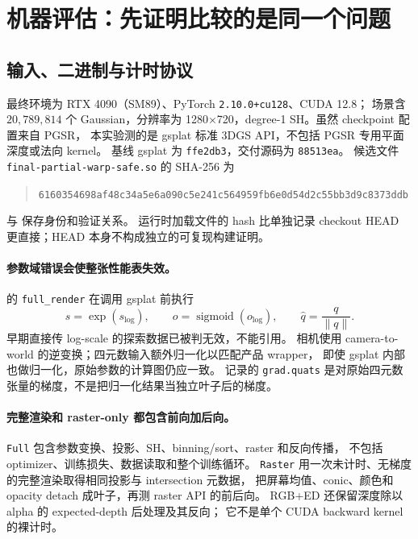 \section{机器评估：先证明比较的是同一个问题}

\subsection{输入、二进制与计时协议}

最终环境为 RTX 4090（SM89）、PyTorch \texttt{2.10.0+cu128}、CUDA 12.8；
场景含 \(20{,}789{,}814\) 个 Gaussian，分辨率为
1280\(\times\)720，degree-1 SH。虽然 checkpoint 配置来自 PGSR，
本实验测的是 gsplat 标准 3DGS API，不包括 PGSR 专用平面深度或法向 kernel。
基线 gsplat 为 \texttt{ffe2db3}，交付源码为 \texttt{88513ea}。
候选文件 \texttt{final-partial-warp-safe.so} 的 SHA-256 为
\begin{quote}\small\ttfamily
\nolinkurl{6160354698af48c34a5e6a090c5e241c564959fb6e0d54d2c55bb3d9c8373ddb}
\end{quote}
 与
 保存身份和验证关系。
运行时加载文件的 hash 比单独记录 checkout HEAD 更直接；HEAD 本身不构成独立的可复现构建证明。

\paragraph{参数域错误会使整张性能表失效。}
 的 \texttt{full\_render}
在调用 gsplat 前执行
\[
 s=\exp(s_{\log}),\qquad o=\operatorname{sigmoid}(o_{\log}),
 \qquad \widehat q=\frac{q}{\|q\|}.
\]
早期直接传 log-scale 的探索数据已被判无效，不能引用。
相机使用 camera-to-world 的逆变换；四元数输入额外归一化以匹配产品 wrapper，
即使 gsplat 内部也做归一化，原始参数的计算图仍应一致。
记录的 \texttt{grad.quats} 是对原始四元数张量的梯度，不是把归一化结果当独立叶子后的梯度。

\paragraph{完整渲染和 raster-only 都包含前向加后向。}
\texttt{Full} 包含参数变换、投影、SH、binning/sort、raster 和反向传播，
不包括 optimizer、训练损失、数据读取和整个训练循环。
\texttt{Raster} 用一次未计时、无梯度的完整渲染取得相同投影与 intersection 元数据，
把屏幕均值、conic、颜色和 opacity detach 成叶子，再测 raster API 的前后向。
RGB+ED 还保留深度除以 alpha 的 expected-depth 后处理及其反向；
它不是单个 CUDA backward kernel 的裸计时。

